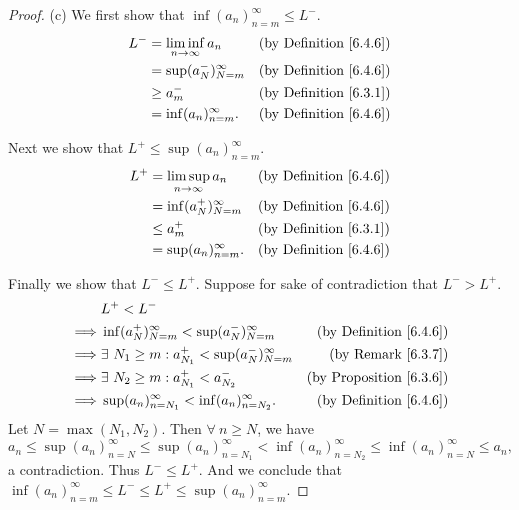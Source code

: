 \begin{proof}{(c)}
    We first show that \(\inf(a_n)_{n = m}^\infty \leq L^-\).
    \begin{align*}
        L^- & = \liminf_{n \to \infty} a_n & \text{(by Definition \ref{6.4.6})} \\
            & = \sup(a_N^-)_{N = m}^\infty  & \text{(by Definition \ref{6.4.6})} \\
            & \geq a_m^-                    & \text{(by Definition \ref{6.3.1})} \\
            & = \inf(a_n)_{n = m}^\infty.   & \text{(by Definition \ref{6.4.6})}
    \end{align*}

    Next we show that \(L^+ \leq \sup(a_n)_{n = m}^\infty\).
    \begin{align*}
        L^+ & = \limsup_{n \to \infty} a_n & \text{(by Definition \ref{6.4.6})} \\
            & = \inf(a_N^+)_{N = m}^\infty  & \text{(by Definition \ref{6.4.6})} \\
            & \leq a_m^+                    & \text{(by Definition \ref{6.3.1})} \\
            & = \sup(a_n)_{n = m}^\infty.   & \text{(by Definition \ref{6.4.6})}
    \end{align*}

    Finally we show that \(L^- \leq L^+\).
    Suppose for sake of contradiction that \(L^- > L^+\).
    \begin{align*}
                 & L^+ < L^-                                                                                          \\
        \implies & \inf(a_N^+)_{N = m}^\infty < \sup(a_N^-)_{N = m}^\infty      & \text{(by Definition \ref{6.4.6})}  \\
        \implies & \exists\ N_1 \geq m : a_{N_1}^+ < \sup(a_N^-)_{N = m}^\infty & \text{(by Remark \ref{6.3.7})}      \\
        \implies & \exists\ N_2 \geq m : a_{N_1}^+ < a_{N_2}^-                  & \text{(by Proposition \ref{6.3.6})} \\
        \implies & \sup(a_n)_{n = N_1}^\infty < \inf(a_n)_{n = N_2}^\infty.     & \text{(by Definition \ref{6.4.6})}
    \end{align*}
    Let \(N = \max(N_1, N_2)\).
    Then \(\forall\ n \geq N\), we have
    \[
        a_n \leq \sup(a_n)_{n = N}^\infty \leq \sup(a_n)_{n = N_1}^\infty < \inf(a_n)_{n = N_2}^\infty \leq \inf(a_n)_{n = N}^\infty \leq a_n,
    \]
    a contradiction.
    Thus \(L^- \leq L^+\).
    And we conclude that \(\inf(a_n)_{n = m}^\infty \leq L^- \leq L^+ \leq \sup(a_n)_{n = m}^\infty\).
\end{proof}

